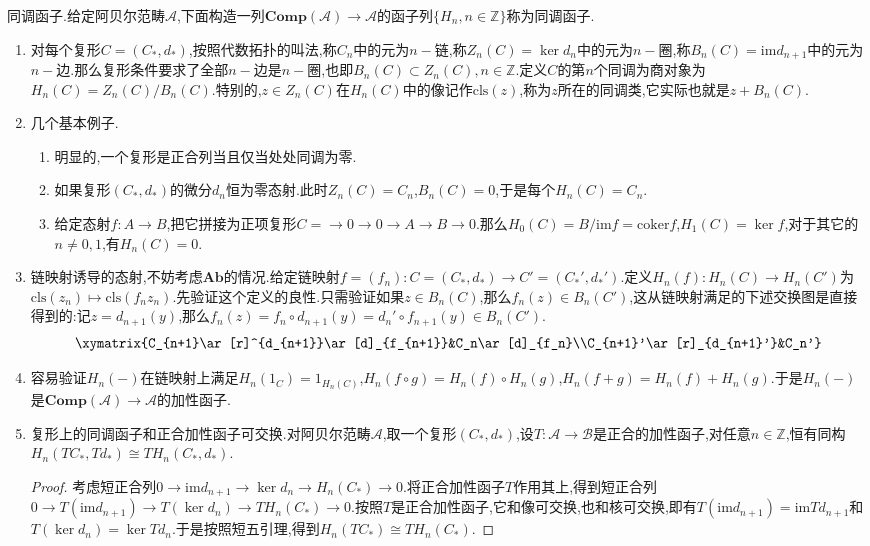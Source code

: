 同调函子.给定阿贝尔范畴$\mathscr{A}$,下面构造一列$\textbf{Comp}(\mathscr{A})\to\mathscr{A}$的函子列$\{H_n,n\in\mathbb{Z}\}$称为同调函子.
\begin{enumerate}
	\item 对每个复形$C=(C_*,d_*)$,按照代数拓扑的叫法,称$C_n$中的元为$n-$链,称$Z_n(C)=\ker d_n$中的元为$n-$圈,称$B_n(C)=\mathrm{im}d_{n+1}$中的元为$n-$边.那么复形条件要求了全部$n-$边是$n-$圈,也即$B_n(C)\subset Z_n(C),n\in\mathbb{Z}$.定义$C$的第$n$个同调为商对象为$H_n(C)=Z_n(C)/B_n(C)$.特别的,$z\in Z_n(C)$在$H_n(C)$中的像记作$\mathrm{cls}(z)$,称为$z$所在的同调类,它实际也就是$z+B_n(C)$.
	\item 几个基本例子.
	\begin{enumerate}
		\item 明显的,一个复形是正合列当且仅当处处同调为零.
		\item 如果复形$(C_*,d_*)$的微分$d_n$恒为零态射.此时$Z_n(C)=C_n$,$B_n(C)=0$,于是每个$H_n(C)=C_n$.
		\item 给定态射$f:A\to B$,把它拼接为正项复形$C=\to0\to0\to A\to B\to0$.那么$H_0(C)=B/\mathrm{im}f=\mathrm{coker}f$,$H_1(C)=\ker f$,对于其它的$n\not=0,1$,有$H_n(C)=0$.
	\end{enumerate}
	\item 链映射诱导的态射,不妨考虑$\textbf{Ab}$的情况.给定链映射$f=(f_n):C=(C_*,d_*)\to C'=(C_*',d_*')$.定义$H_n(f):H_n(C)\to H_n(C')$为$\mathrm{cls}(z_n)\mapsto\mathrm{cls}(f_nz_n)$.先验证这个定义的良性.只需验证如果$z\in B_n(C)$,那么$f_n(z)\in B_n(C')$,这从链映射满足的下述交换图是直接得到的:记$z=d_{n+1}(y)$,那么$f_n(z)=f_n\circ d_{n+1}(y)=d_n'\circ f_{n+1}(y)\in B_n(C')$.
	$$\xymatrix{C_{n+1}\ar[r]^{d_{n+1}}\ar[d]_{f_{n+1}}&C_n\ar[d]_{f_n}\\C_{n+1}'\ar[r]_{d_{n+1}'}&C_n'}$$
	\item 容易验证$H_n(-)$在链映射上满足$H_n(1_C)=1_{H_n(C)}$,$H_n(f\circ g)=H_n(f)\circ H_n(g)$,$H_n(f+g)=H_n(f)+H_n(g)$.于是$H_n(-)$是$\textbf{Comp}(\mathscr{A})\to\mathscr{A}$的加性函子.
	\item 复形上的同调函子和正合加性函子可交换.对阿贝尔范畴$\mathscr{A}$,取一个复形$(C_*,d_*)$,设$T:\mathscr{A}\to\mathscr{B}$是正合的加性函子,对任意$n\in\mathbb{Z}$,恒有同构$H_n(TC_*,Td_*)\cong TH_n(C_*,d_*)$.
	\begin{proof}
		
		考虑短正合列$0\to\mathrm{im}d_{n+1}\to\ker d_n\to H_n(C_*)\to0$.将正合加性函子$T$作用其上,得到短正合列$0\to T(\mathrm{im}d_{n+1})\to T(\ker d_n)\to TH_n(C_*)\to0$.按照$T$是正合加性函子,它和像可交换,也和核可交换,即有$T(\mathrm{im}d_ {n+1})=\mathrm{im}Td_{n+1}$和$T(\ker d_n)=\ker Td_n$.于是按照短五引理,得到$H_n(TC_*)\cong TH_n(C_*)$.
	\end{proof}
\end{enumerate}

